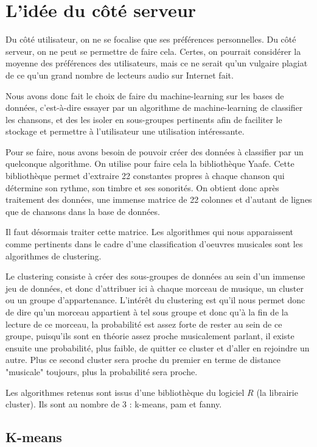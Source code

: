 \documentclass{report}
\begin{document}
\section{L'idée du côté serveur}

Du côté utilisateur, on ne se focalise que ses préférences personnelles. Du côté serveur, on ne peut se permettre de faire cela. Certes, on pourrait considérer la moyenne des préférences des utilisateurs, mais ce ne serait qu'un vulgaire plagiat de ce qu'un grand nombre de lecteurs audio sur Internet fait.

Nous avons donc fait le choix de faire du machine-learning sur les bases de données, c'est-à-dire essayer par un algorithme de machine-learning de classifier les chansons, et des les isoler en sous-groupes pertinents afin de faciliter le stockage et permettre à l'utilisateur une utilisation intéressante.

Pour se faire, nous avons besoin de pouvoir créer des données à classifier par un quelconque algorithme. On utilise pour faire cela la bibliothèque Yaafe. Cette bibliothèque permet d'extraire 22 constantes propres à chaque chanson qui détermine son rythme, son timbre et ses sonorités. On obtient donc après traitement des données, une immense matrice de 22 colonnes et d'autant de lignes que de chansons dans la base de données.

Il faut désormais traiter cette matrice. Les algorithmes qui nous apparaissent comme pertinents dans le cadre d'une classification d'oeuvres musicales sont les algorithmes de clustering.

Le clustering consiste à créer des sous-groupes de données au sein d'un immense jeu de données, et donc d'attribuer ici à chaque morceau de musique, un cluster ou un groupe d'appartenance. L'intérêt du clustering est qu'il nous permet donc de dire qu'un morceau appartient à tel sous groupe et donc qu'à la fin de la lecture de ce morceau, la probabilité est assez forte de rester au sein de ce groupe, puisqu'ils sont en théorie assez proche musicalement parlant, il existe ensuite une probabilité, plus faible, de quitter ce cluster et d'aller en rejoindre un autre. Plus ce second cluster sera proche du premier en terme de distance "musicale" toujours, plus la probabilité sera proche.


Les algorithmes retenus sont issus d'une bibliothèque du logiciel $R$ (la librairie cluster). Ils sont au nombre de 3 : k-means, pam et fanny.

\subsection{K-means}
\end{document}
